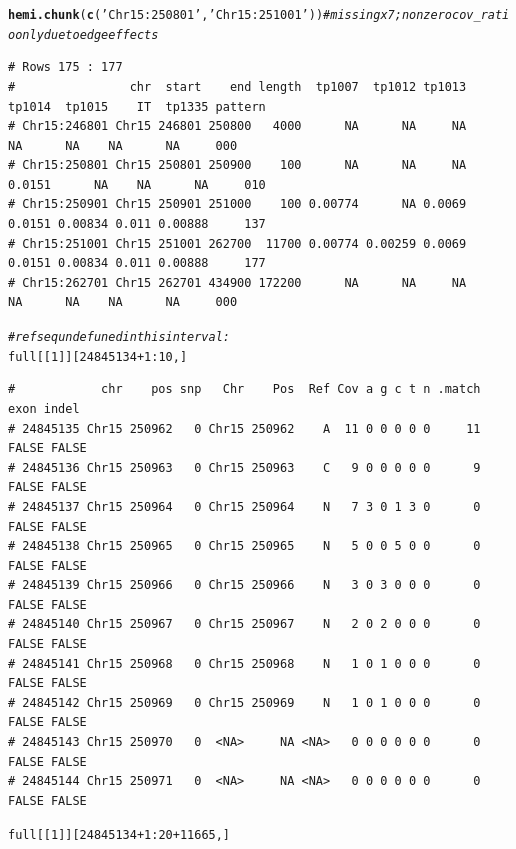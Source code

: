 \documentclass{article}\usepackage[]{graphicx}\usepackage[]{color}
\makeatletter
\newcommand{\hlnum}[1]{\textcolor[rgb]{0.686,0.059,0.569}{#1}}%
\newcommand{\hlstr}[1]{\textcolor[rgb]{0.192,0.494,0.8}{#1}}%
\newcommand{\hlcom}[1]{\textcolor[rgb]{0.678,0.584,0.686}{\textit{#1}}}%
\newcommand{\hlopt}[1]{\textcolor[rgb]{0,0,0}{#1}}%
\newcommand{\hlstd}[1]{\textcolor[rgb]{0.345,0.345,0.345}{#1}}%
\newcommand{\hlkwd}[1]{\textcolor[rgb]{0.737,0.353,0.396}{\textbf{#1}}}%
\newenvironment{kframe}{%
 \def\at@end@of@kframe{}%
 \ifinner\ifhmode%
  \def\at@end@of@kframe{\end{minipage}}%
  \begin{minipage}{\columnwidth}%
 \fi\fi%
 \def\FrameCommand##1{\hskip\@totalleftmargin \hskip-\fboxsep
 \colorbox{shadecolor}{##1}\hskip-\fboxsep
     \hskip-\linewidth \hskip-\@totalleftmargin \hskip\columnwidth}%
 \MakeFramed {\advance\hsize-\width
   \@totalleftmargin\z@ \linewidth\hsize
   \@setminipage}}%
 {\par\unskip\endMakeFramed%
 \at@end@of@kframe}
\newenvironment{knitrout}{}{} %
\makeatother
\begin{document}
\begin{knitrout}\footnotesize
{}\color{fgcolor}\begin{kframe}
\begin{alltt}
\hlkwd{hemi.chunk}\hlstd{(}\hlkwd{c}\hlstd{(}\hlstr{'Chr15:250801'}\hlstd{,}\hlstr{'Chr15:251001'}\hlstd{))} \hlcom{# missing x 7; nonzero cov_ratio only due to edge effects}
\end{alltt}
\begin{verbatim}
# Rows 175 : 177 
#                chr  start    end length  tp1007  tp1012 tp1013 tp1014  tp1015    IT  tp1335 pattern
# Chr15:246801 Chr15 246801 250800   4000      NA      NA     NA     NA      NA    NA      NA     000
# Chr15:250801 Chr15 250801 250900    100      NA      NA     NA 0.0151      NA    NA      NA     010
# Chr15:250901 Chr15 250901 251000    100 0.00774      NA 0.0069 0.0151 0.00834 0.011 0.00888     137
# Chr15:251001 Chr15 251001 262700  11700 0.00774 0.00259 0.0069 0.0151 0.00834 0.011 0.00888     177
# Chr15:262701 Chr15 262701 434900 172200      NA      NA     NA     NA      NA    NA      NA     000
\end{verbatim}
\begin{alltt}
\hlcom{# ref seq undefuned in this interval:}
\hlstd{full[[}\hlnum{1}\hlstd{]][}\hlnum{24845134}\hlopt{+}\hlnum{1}\hlopt{:}\hlnum{10}\hlstd{,]}
\end{alltt}
\begin{verbatim}
#            chr    pos snp   Chr    Pos  Ref Cov a g c t n .match  exon indel
# 24845135 Chr15 250962   0 Chr15 250962    A  11 0 0 0 0 0     11 FALSE FALSE
# 24845136 Chr15 250963   0 Chr15 250963    C   9 0 0 0 0 0      9 FALSE FALSE
# 24845137 Chr15 250964   0 Chr15 250964    N   7 3 0 1 3 0      0 FALSE FALSE
# 24845138 Chr15 250965   0 Chr15 250965    N   5 0 0 5 0 0      0 FALSE FALSE
# 24845139 Chr15 250966   0 Chr15 250966    N   3 0 3 0 0 0      0 FALSE FALSE
# 24845140 Chr15 250967   0 Chr15 250967    N   2 0 2 0 0 0      0 FALSE FALSE
# 24845141 Chr15 250968   0 Chr15 250968    N   1 0 1 0 0 0      0 FALSE FALSE
# 24845142 Chr15 250969   0 Chr15 250969    N   1 0 1 0 0 0      0 FALSE FALSE
# 24845143 Chr15 250970   0  <NA>     NA <NA>   0 0 0 0 0 0      0 FALSE FALSE
# 24845144 Chr15 250971   0  <NA>     NA <NA>   0 0 0 0 0 0      0 FALSE FALSE
\end{verbatim}
\begin{alltt}
\hlstd{full[[}\hlnum{1}\hlstd{]][}\hlnum{24845134}\hlopt{+}\hlnum{1}\hlopt{:}\hlnum{20}\hlopt{+}\hlnum{11665}\hlstd{,]}

\end{alltt}
\end{kframe}
\end{knitrout}
\end{document}
